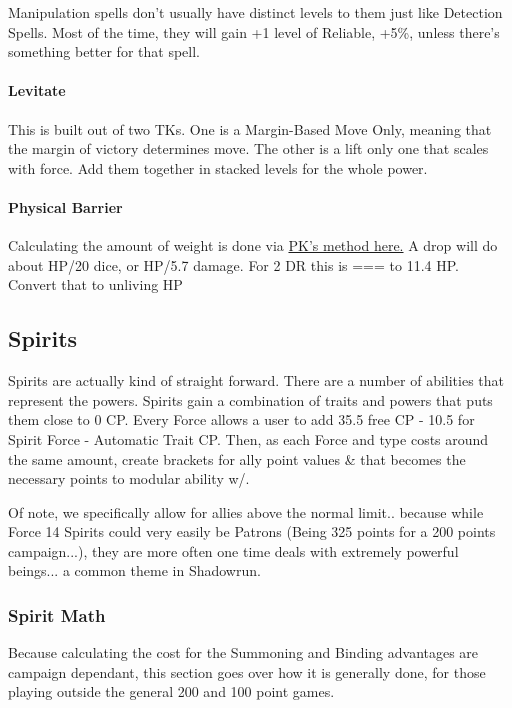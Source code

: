\begin{multicols*}{2}
	Manipulation spells don't usually have distinct levels to them just like Detection Spells. Most of the time, they will gain +1 level of Reliable, +5\%, unless there's something better for that spell.
	
	\paragraph{Levitate}
	This is built out of two TKs. One is a Margin-Based Move Only, meaning that the margin of victory determines move. The other is a lift only one that scales with force. Add them together in stacked levels for the whole power.
	
	\paragraph{Physical Barrier}
	
	Calculating the amount of weight is done via \href{https://forums.sjgames.com/showpost.php?p=1936968&postcount=10}{PK's method here.}  A drop will do about HP/20 dice, or HP/5.7 damage. For 2 DR this is  === to 11.4 HP. Convert that to unliving HP
	
	\subsection{Spirits}
	
	Spirits are actually kind of straight forward. There are a number of abilities that represent the powers. Spirits gain a combination of traits and powers that puts them close to 0 CP. Every Force allows a user to add 35.5 free CP - 10.5 for Spirit Force - Automatic Trait CP.  Then, as each Force and type costs around the same amount, create brackets for ally point values \& that becomes the necessary points to modular ability w/.
	
	Of note, we specifically allow for allies above the normal limit.. because while Force 14 Spirits could very easily be Patrons (Being 325 points for a 200 points campaign...), they are more often one time deals with extremely powerful beings... a common theme in Shadowrun.
	
	\subsubsection{Spirit Math}\label{spirit_math}
	
	Because calculating the cost for the Summoning and Binding advantages are campaign dependant, this section goes over how it is generally done, for those playing outside the general 200 and 100 point games.
	

\end{multicols*}

